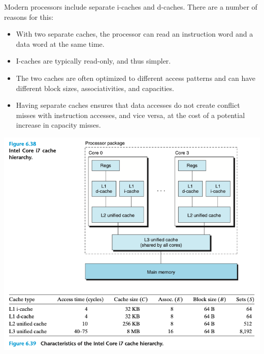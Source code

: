 \documentclass[11pt]{article}
\begin{document}
Modern processors include separate i-caches and d-caches. There are a number of reasons for this:\\
\begin{itemize}
\item With two separate caches, the processor can read an instruction word and a data word at the same time.\\
\item I-caches are typically read-only, and thus simpler.\\
\item The two caches are often optimized to different access patterns and can have different block sizes, associativities, and capacities.\\
\item Having separate caches ensures that data accesses do not create conflict misses with instruction accesses, and vice versa, at the cost of a potential increase in capacity misses.\\
\end{itemize}

\begin{center}
\includegraphics[width=.9\linewidth]{pics/figure6.38-6.39-intel-i7-cache.png}
\end{center}
\end{document}
